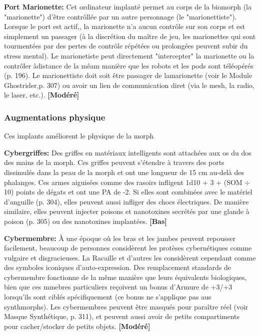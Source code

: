 \textbf{Port Marionette:} Cet ordinateur implanté permet au corps de la biomorph (la "marionette") d'être contrôllée par un autre personnage (le "marionettiste"). Lorsque le port est actif,, la marionette n'a aucun contrôle sur son corps et est simplement un passager (à la discrétion du maître de jeu, les marionettes qui sont tourmentées par des pertes de contrôle répétées ou prolongées peuvent subir du stress mental). Le marionetiste peut directement "intercepter" la marionette ou la contrôler àdistance de la mêam manière que les robots et les pods sont téléopérés (p. 196). Le marionettiste doit soit être passager de lamarionette (voir le Module Ghostrider,p. 307) ou avoir un lien de communication diret (via le mesh, la radio, le laser, etc.). \textbf{[Modéré]} 

\subsubsection{Augmentations physique} 

Ces implants améliorent le physique de la morph 

\textbf{Cybergriffes:} Des griffes en matériaux intelligents sont attachées aux os du dos des mains de la morph. Ces griffes peuvent s'étendre à travers des ports dissimulés dans la peau de la morph et ont une longueur de 15 cm au-delà des phalanges. Ces armes aiguisées comme des rasoirs infligent 1d10 + 3 + (SOM $\div$ 10) points de dégats et ont une PA de -2. Si elles sont combinées avec le matériel d'anguille (p. 304), elles peuvent aussi infliger des chocs électriques. De manière similaire, elles peuvent injecter poisons et nanotoxines secrétés par une glande à poison (p. 305) ou des nanotoxines implantées. \textbf{[Bas]} 

\textbf{Cybermembre:} À une époque où les bras et les jambes peuvent repousser facilement, beaucoup de personnes considèrent les protèses cybernétiques comme vulgaire et disgracieuses. La Racaille et d'autres les considèrent cependant comme des symboles iconiques d'auto-expression. Des remplacement standards de cybermembre fonctionne de la même manière que leurs équivalents biologiques, bien que ces mmebres particuliers reçoivent un bonus d'Armure de +3/+3 lorsqu'ils sont ciblés spécifiquement (ce bonus ne s'applique pas aus synthmorphs). Les cybermembres peuvent être masqués pour paraître réel (voir Masque Synthétique, p. 311), et peuvent aussi avoir de petits compartiments pour cacher/stocker de petits objets. \textbf{[Modéré]} 

